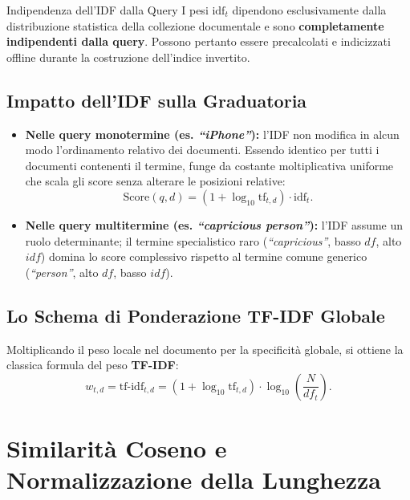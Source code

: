 \begin{noteblock}{Indipendenza dell'IDF dalla Query}
I pesi $\text{idf}_t$ dipendono esclusivamente dalla distribuzione statistica della collezione documentale e sono \textbf{completamente indipendenti dalla query}. Possono pertanto essere precalcolati e indicizzati offline durante la costruzione dell'indice invertito.
\end{noteblock}

\subsection{Impatto dell'IDF sulla Graduatoria}
\begin{itemize}
    \item \textbf{Nelle query monotermine (es. \textit{``iPhone''}):} l'IDF non modifica in alcun modo l'ordinamento relativo dei documenti. Essendo identico per tutti i documenti contenenti il termine, funge da costante moltiplicativa uniforme che scala gli score senza alterare le posizioni relative:
    \begin{equation}
    \text{Score}(q, d) = (1 + \log_{10}\text{tf}_{t,d}) \cdot \text{idf}_t.
    \end{equation}
    \item \textbf{Nelle query multitermine (es. \textit{``capricious person''}):} l'IDF assume un ruolo determinante; il termine specialistico raro (\textit{``capricious''}, basso $df$, alto $idf$) domina lo score complessivo rispetto al termine comune generico (\textit{``person''}, alto $df$, basso $idf$).
\end{itemize}

\subsection{Lo Schema di Ponderazione TF-IDF Globale}
Moltiplicando il peso locale nel documento per la specificit\`a globale, si ottiene la classica formula del peso \textbf{TF-IDF}:
\begin{equation}
w_{t,d} = \text{tf-idf}_{t,d} = (1 + \log_{10}\text{tf}_{t,d}) \cdot \log_{10}\left(\frac{N}{df_t}\right).
\label{eq:tfidf-weight}
\end{equation}

\FloatBarrier
\section{Similarit\`a Coseno e Normalizzazione della Lunghezza}
\label{sec:cosine-similarity}

